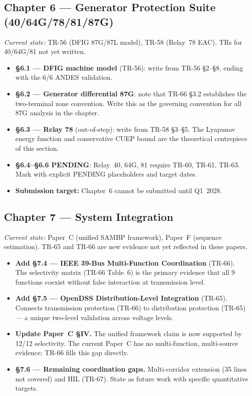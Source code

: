 \documentclass[12pt,a4paper]{article}
\begin{document}
\subsection{Chapter 6 — Generator Protection Suite (40/64G/78/81/87G)}

\textit{Current state:} TR-56 (DFIG 87G/87L model), TR-58 (Relay~78 EAC).
TRs for 40/64G/81 not yet written.

\begin{itemize}
  \item \textbf{§6.1 — DFIG machine model} (TR-56): write from TR-56 §2--§8,
    ending with the 6/6 ANDES validation.
  \item \textbf{§6.2 — Generator differential 87G}: note that TR-66 §3.2 establishes
    the two-terminal zone convention.  Write this as the governing convention
    for all 87G analysis in the chapter.
  \item \textbf{§6.3 — Relay 78} (out-of-step): write from TR-58 §3--§5.
    The Lyapunov energy function and conservative CUEP bound are the
    theoretical centrepiece of this section.
  \item \textbf{§6.4--§6.6 PENDING}: Relay~40, 64G, 81 require TR-60, TR-61, TR-63.
    Mark with explicit PENDING placeholders and target dates.
  \item \textbf{Submission target:} Chapter~6 cannot be submitted until Q1~2028.
\end{itemize}

\subsection{Chapter 7 — System Integration}

\textit{Current state:} Paper~C (unified SAMBP framework), Paper~F (sequence estimation).
TR-65 and TR-66 are new evidence not yet reflected in these papers.

\begin{itemize}
  \item \textbf{Add §7.4 — IEEE 39-Bus Multi-Function Coordination} (TR-66).
    The selectivity matrix (TR-66 Table~6) is the primary evidence that all 9 functions
    coexist without false interaction at transmission level.
  \item \textbf{Add §7.5 — OpenDSS Distribution-Level Integration} (TR-65).
    Connects transmission protection (TR-66) to distribution protection (TR-65) —
    a unique two-level validation across voltage levels.
  \item \textbf{Update Paper~C §IV.}
    The unified framework claim is now supported by 12/12 selectivity.
    The current Paper~C has no multi-function, multi-source evidence;
    TR-66 fills this gap directly.
  \item \textbf{§7.6 — Remaining coordination gaps.}
    Multi-corridor extension (35 lines not covered) and HIL (TR-67).
    State as future work with specific quantitative targets.
\end{itemize}
\end{document}
